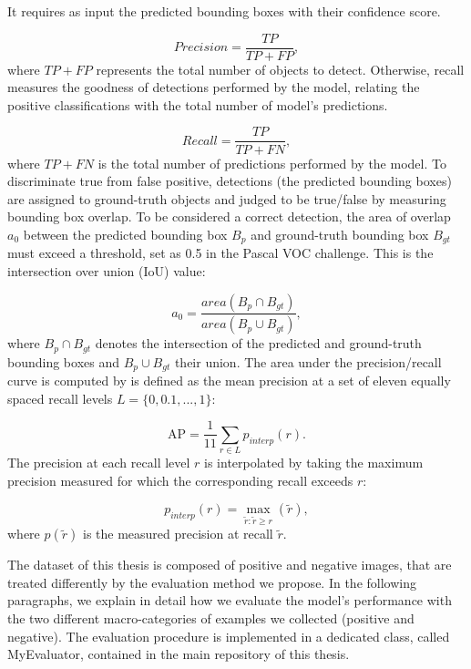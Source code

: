It requires as input the predicted bounding boxes with their confidence score.

\begin{equation}
\label{eq:precision}
Precision = \frac{TP}{TP + FP},
\end{equation}
where $TP + FP$ represents the total number of objects to detect. Otherwise, recall measures the goodness of detections performed by the model, relating the positive classifications with the total number of model's predictions.

\begin{equation}
\label{eq:recall}
Recall = \frac{TP}{TP + FN},
\end{equation}
where $TP + FN$ is the total number of predictions performed by the model. 
To discriminate true from false positive, detections (the predicted bounding boxes) are assigned to  ground-truth objects and judged to be true/false by measuring bounding box overlap. To be considered a correct detection, the area of overlap $a_0$ between the predicted bounding
box $B_p$ and  ground-truth bounding box $B_{gt}$ must exceed a threshold, set as 0.5 in the Pascal VOC challenge. This is the intersection over union (IoU) value:

\begin{equation}
\label{eq:iou}
a_0 = \frac{area(B_p \cap B_{gt})}{area(B_p \cup B_{gt})},
\end{equation}
where $B_p \cap B_{gt}$ denotes the intersection of the predicted and
 ground-truth bounding boxes and $B_p \cup B_{gt}$ their union. The area under the precision/recall curve is computed by is defined as the mean precision at a set of eleven equally spaced recall levels $ L = \{0, 0.1,..., 1\}$:

\begin{equation}
\label{eq:11-point}
	\text{AP} = \frac{1}{11} \sum_{r \in L} p_{interp}(r).
\end{equation}
The precision at each recall level $r$ is interpolated by taking
the maximum precision measured for which the corresponding recall exceeds $r$:

\begin{equation}
p_{interp} (r) = \max_{\tilde{r} : \tilde{r} \geq r} (\tilde{r}),
\end{equation}
where $p(\tilde{r})$ is the measured precision at recall $\tilde{r}$. 

The dataset of this thesis is composed of positive and negative images, that are treated differently by the evaluation method we propose. In the following paragraphs, we explain in detail how we evaluate the model's performance with the two different macro-categories of examples we collected (positive and negative). The evaluation procedure is implemented in a dedicated class, called \textsf{MyEvaluator}, contained in the main repository of this thesis. 

